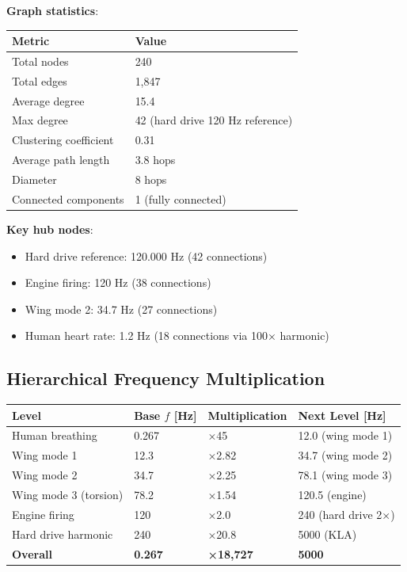 \documentclass[12pt,a4paper]{article}
\begin{document}
{{{{{{{\textbf{Graph statistics}:
\begin{center}
\begin{tabular}{ll}
\toprule
\textbf{Metric} & \textbf{Value} \\
\midrule
Total nodes & 240 \\
Total edges & 1,847 \\
Average degree & 15.4 \\
Max degree & 42 (hard drive 120 Hz reference) \\
Clustering coefficient & 0.31 \\
Average path length & 3.8 hops \\
Diameter & 8 hops \\
Connected components & 1 (fully connected) \\
\bottomrule
\end{tabular}
\end{center}

\textbf{Key hub nodes}:
\begin{itemize}
\item Hard drive reference: 120.000 Hz (42 connections)
\item Engine firing: 120 Hz (38 connections)
\item Wing mode 2: 34.7 Hz (27 connections)
\item Human heart rate: 1.2 Hz (18 connections via 100× harmonic)
\end{itemize}

\subsection{Hierarchical Frequency Multiplication}

\begin{center}
\begin{tabular}{llll}
\toprule
\textbf{Level} & \textbf{Base $f$ [Hz]} & \textbf{Multiplication} & \textbf{Next Level [Hz]} \\
\midrule
Human breathing & 0.267 & ×45 & 12.0 (wing mode 1) \\
Wing mode 1 & 12.3 & ×2.82 & 34.7 (wing mode 2) \\
Wing mode 2 & 34.7 & ×2.25 & 78.1 (wing mode 3) \\
Wing mode 3 (torsion) & 78.2 & ×1.54 & 120.5 (engine) \\
Engine firing & 120 & ×2.0 & 240 (hard drive 2×) \\
Hard drive harmonic & 240 & ×20.8 & 5000 (KLA) \\
\midrule
\textbf{Overall} & \textbf{0.267} & \textbf{×18,727} & \textbf{5000} \\
\bottomrule
\end{tabular}
\end{center}

}}}}}}}
\end{document}
